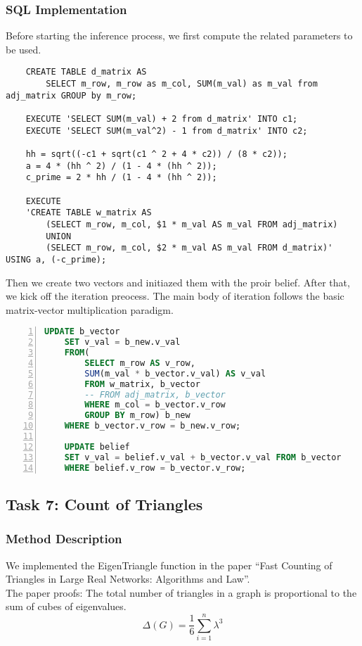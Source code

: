 \subsubsection{SQL Implementation}
Before starting the inference process, we first compute the related parameters to be used.
\begin{verbatim}
	CREATE TABLE d_matrix AS
		SELECT m_row, m_row as m_col, SUM(m_val) as m_val from adj_matrix GROUP by m_row;

	EXECUTE 'SELECT SUM(m_val) + 2 from d_matrix' INTO c1; 
	EXECUTE 'SELECT SUM(m_val^2) - 1 from d_matrix' INTO c2; 

	hh = sqrt((-c1 + sqrt(c1 ^ 2 + 4 * c2)) / (8 * c2));
	a = 4 * (hh ^ 2) / (1 - 4 * (hh ^ 2));
	c_prime = 2 * hh / (1 - 4 * (hh ^ 2));

	EXECUTE 
	'CREATE TABLE w_matrix AS
		(SELECT m_row, m_col, $1 * m_val AS m_val FROM adj_matrix)
		UNION
		(SELECT m_row, m_col, $2 * m_val AS m_val FROM d_matrix)' USING a, (-c_prime);
\end{verbatim}
Then we create two vectors and initiazed them with the proir belief. After that, we kick off the iteration preocess. The main body of iteration follows the basic matrix-vector multiplication paradigm.
\begin{lstlisting}[caption=Belief Propagation, label=bp, language=SQL, numbers=left, numberstyle=\tiny, breaklines, tabsize=2, frame=single, keepspaces=false]
	UPDATE b_vector
	SET v_val = b_new.v_val
	FROM(
		SELECT m_row AS v_row, 
		SUM(m_val * b_vector.v_val) AS v_val
		FROM w_matrix, b_vector
		-- FROM adj_matrix, b_vector
		WHERE m_col = b_vector.v_row
		GROUP BY m_row) b_new
	WHERE b_vector.v_row = b_new.v_row;

	UPDATE belief
	SET v_val = belief.v_val + b_vector.v_val FROM b_vector
	WHERE belief.v_row = b_vector.v_row;	
\end{lstlisting}

\subsection{Task 7: Count of Triangles}
\subsubsection{Method Description}
We implemented the EigenTriangle function in the paper “Fast Counting of Triangles in Large Real Networks: Algorithms and Law”\cite{4781156}. \\
The paper proofs: The total number of triangles in a graph is proportional to the sum of cubes of eigenvalues.
\[\Delta(G) = \frac{1}{6}\sum_{i=1}^n{\lambda^3}\]

